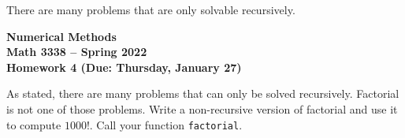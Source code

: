 \documentclass[11pt,letterpaper]{article}
\newcommand{\semester}{Spring 2022}
\newcommand{\due}{Thursday, January 27}
\begin{document}
There are many problems that are only solvable recursively.












\newpage

\begin{center}
{\huge{\bf  Numerical Methods}} \\[1.5ex]
{\bf Math 3338 -- \semester}\\[1.5ex]
{\Large{\bf Homework 4 (Due: \due)}}\\
\end{center}
\vspace{2mm}



\begin{problem}
As stated, there are many problems that can only be solved recursively. Factorial is not one of
those problems. Write a non-recursive version of factorial and use it to compute $1000!$.
Call your function \texttt{factorial}.
\end{problem}
\end{document}
